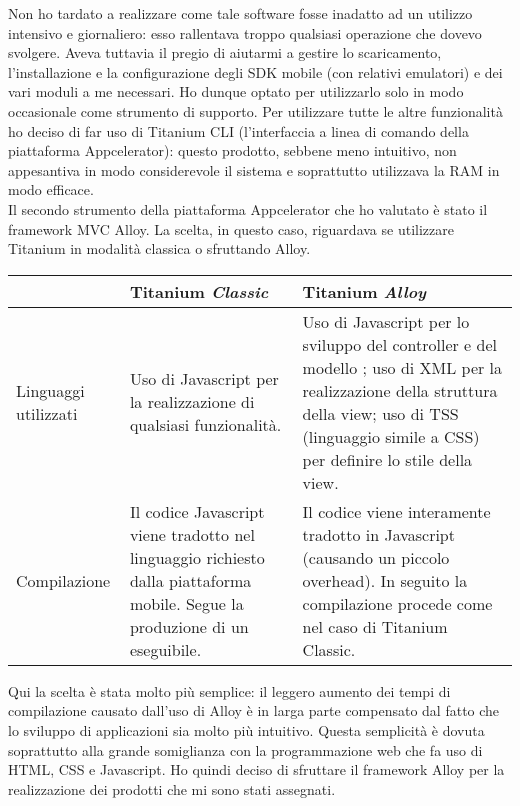 				Non ho tardato a realizzare come tale software fosse inadatto ad un utilizzo intensivo e giornaliero: esso rallentava
				troppo qualsiasi operazione che dovevo svolgere. Aveva tuttavia il pregio di aiutarmi a gestire lo scaricamento,
				l'installazione e la configurazione degli SDK mobile (con relativi emulatori) e dei vari moduli a me necessari. Ho
				dunque optato per utilizzarlo solo in modo occasionale come strumento di supporto. Per utilizzare tutte le altre
				funzionalità ho deciso di far uso di Titanium CLI (l'interfaccia a linea di comando della piattaforma Appcelerator):
				questo prodotto, sebbene meno intuitivo, non appesantiva in modo considerevole il sistema e soprattutto utilizzava la
				RAM in modo efficace.\\
				Il secondo strumento della piattaforma Appcelerator che ho valutato è stato il framework MVC Alloy. La scelta, in
				questo caso, riguardava se utilizzare Titanium in modalità classica o sfruttando Alloy.
				\begin{center}
					\begin{tabular}[H]{| p{} | p{0.35\textwidth} | p{} |}
						\hline
						&
						Titanium \emph{Classic}&
						Titanium \emph{Alloy}\\
						\hline\hline
						Linguaggi utilizzati &
						Uso di Javascript per la realizzazione di qualsiasi funzionalità. &
						Uso di Javascript per lo sviluppo del controller e del modello ; uso di XML per la realizzazione
						della struttura della view; uso di TSS (linguaggio simile a CSS) per definire lo stile della view.\\
						\hline
						Compilazione &
						Il codice Javascript viene tradotto nel linguaggio richiesto dalla piattaforma mobile. Segue la
						produzione di un eseguibile. &
						Il codice viene interamente tradotto in Javascript (causando un piccolo overhead). In seguito la
						compilazione procede come nel caso di Titanium Classic.\\
						\hline
					\end{tabular}
				\end{center}
				Qui la scelta è	stata molto più semplice: il leggero aumento dei tempi di compilazione causato dall'uso di Alloy
				è in larga parte compensato dal fatto che lo sviluppo di applicazioni sia molto più intuitivo. Questa semplicità è
				dovuta soprattutto alla grande somiglianza con la programmazione web che fa uso di HTML, CSS e Javascript. Ho quindi
				deciso di sfruttare il framework Alloy per la realizzazione dei prodotti che mi sono stati assegnati.\\
